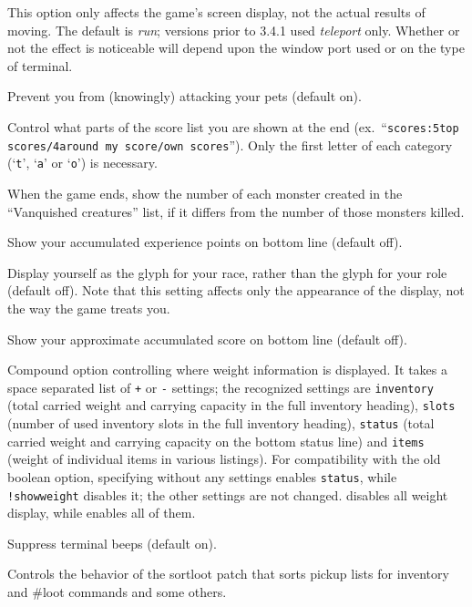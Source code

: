This option only affects the game's screen display, not the actual
results of moving.  The default is {\it run\/}; versions prior to 3.4.1 
used {\it teleport\/} only.  Whether or not the effect is noticeable will
depend upon the window port used or on the type of terminal.
\item[\ib{safe\_pet}]
Prevent you from (knowingly) attacking your pets (default on).
\item[\ib{scores}]
Control what parts of the score list you are shown at the end (ex.\
``{\tt scores:5top scores/4around my score/own scores}'').  Only the first
letter of each category (`{\tt t}', `{\tt a}' or `{\tt o}') is necessary.
\item[\ib{showborn}]
When the game ends, show the number of each monster created
in the ``Vanquished creatures'' list, if it differs from the
number of those monsters killed.
\item[\ib{showexp}]
Show your accumulated experience points on bottom line (default off).
\item[\ib{showrace}]
Display yourself as the glyph for your race, rather than the glyph
for your role (default off).  Note that this setting affects only
the appearance of the display, not the way the game treats you.
\item[\ib{showscore}]
Show your approximate accumulated score on bottom line (default off).
\item[\ib{showweight}]
Compound option controlling where weight information is displayed.
It takes a space separated list of {\tt +} or {\tt -} settings;
the recognized settings are {\tt inventory} (total carried weight and
carrying capacity in the full inventory heading), {\tt slots} (number
of used inventory slots in the full inventory heading), {\tt status}
(total carried weight and carrying capacity on the bottom status line)
and {\tt items} (weight of individual items in various listings).
For compatibility with the old boolean option, specifying
 without any settings enables {\tt status}, while
{\tt !showweight} disables it; the other settings are not changed.
\ib{showweight:none}
disables all weight display, while
enables all of them.
\item[\ib{silent}]
Suppress terminal beeps (default on).
\item[\ib{sortloot}]
Controls the behavior of the sortloot patch that sorts pickup lists for
inventory and \#loot commands and some others.

